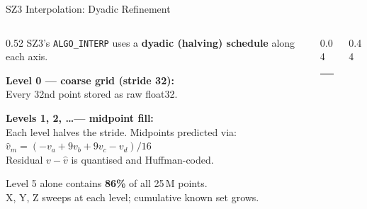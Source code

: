 \documentclass[aspectratio=169, 10pt]{beamer}
\begin{document}
\begin{frame}[shrink=5]{SZ3 Interpolation: Dyadic Refinement}
\vspace{0.15em}
\begin{columns}[T, totalwidth=\textwidth]
  \begin{column}{0.52\textwidth}
    {\footnotesize SZ3's \texttt{ALGO\_INTERP} uses a \textbf{dyadic (halving)
    schedule} along each axis.}

    \smallskip
    {\footnotesize\bfseries\color{cteal} Level 0 — coarse grid (stride 32):}\\[1pt]
    {\footnotesize Every 32nd point stored as raw float32.}

    \smallskip
    {\footnotesize\bfseries\color{cteal} Levels 1, 2, \ldots — midpoint fill:}\\[1pt]
    {\footnotesize Each level halves the stride. Midpoints predicted via:
    $\hat{v}_m = (-v_a + 9v_b + 9v_c - v_d)/16$}\\[2pt]
    {\footnotesize Residual $v - \hat{v}$ is quantised and Huffman-coded.}

    \smallskip
    {\scriptsize\color{cmuted}
      Level 5 alone contains \textbf{86\%} of all 25\,M points.\\
      X, Y, Z sweeps at each level; cumulative known set grows.}
  \end{column}

  \begin{column}{0.04\textwidth}
    \color{cteal}\rule{1pt}{0.78\textheight}
  \end{column}

  \begin{column}{0.44\textwidth}
  \end{column}
\end{columns}
\end{frame}
\end{document}
